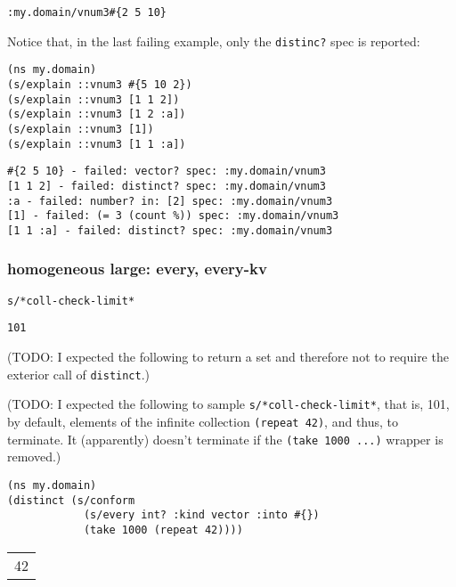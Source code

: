 \documentclass[10pt,oneside,x11names]{article}
\begin{document}
\begin{verbatim}
:my.domain/vnum3#{2 5 10}
\end{verbatim}


Notice that, in the last failing example, only the \texttt{distinc?} spec is reported:

\begin{verbatim}
(ns my.domain)
(s/explain ::vnum3 #{5 10 2})
(s/explain ::vnum3 [1 1 2])
(s/explain ::vnum3 [1 2 :a])
(s/explain ::vnum3 [1])
(s/explain ::vnum3 [1 1 :a])
\end{verbatim}

\begin{verbatim}
#{2 5 10} - failed: vector? spec: :my.domain/vnum3
[1 1 2] - failed: distinct? spec: :my.domain/vnum3
:a - failed: number? in: [2] spec: :my.domain/vnum3
[1] - failed: (= 3 (count %)) spec: :my.domain/vnum3
[1 1 :a] - failed: distinct? spec: :my.domain/vnum3
\end{verbatim}

\subsubsection{homogeneous large: every, every-kv}
\label{sec:orgf848ead}

\begin{verbatim}
s/*coll-check-limit*
\end{verbatim}

\begin{verbatim}
101
\end{verbatim}


(TODO: I expected the following to return a set and therefore not to require the
exterior call of \texttt{distinct}.)

(TODO: I expected the following to sample \texttt{s/*coll-check-limit*}, that is, 101,
by default, elements of the infinite collection \texttt{(repeat 42)}, and thus, to
terminate. It (apparently) doesn't terminate if the \texttt{(take 1000 ...)} wrapper is
removed.)

\begin{verbatim}
(ns my.domain)
(distinct (s/conform
            (s/every int? :kind vector :into #{})
            (take 1000 (repeat 42))))
\end{verbatim}

\begin{center}
\begin{tabular}{r}
42\\
\end{tabular}
\end{center}
\end{document}
